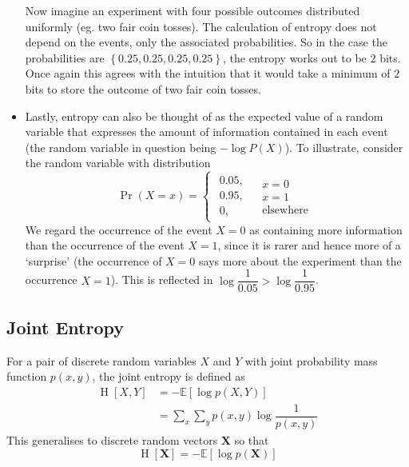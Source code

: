 \documentclass[11pt]{report} %
\begin{document}
\begin{itemize}
Now imagine an experiment with four possible outcomes distributed uniformly (eg. two fair coin tosses). The calculation of entropy does not depend on the events, only the associated probabilities. So in the case the probabilities are $\left\{0.25, 0.25, 0.25, 0.25\right\}$, the entropy works out to be $2$ bits. Once again this agrees with the intuition that it would take a minimum of $2$ bits to store the outcome of two fair coin tosses.
\item Lastly, entropy can also be thought of as the expected value of a random variable that expresses the amount of information contained in each event (the random variable in question being $-\log P\left(X\right)$). To illustrate, consider the random variable with distribution
\begin{equation}
\operatorname{Pr}\left(X = x\right) = \begin{cases}
\begin{array}{c}
0.05,\\
0.95,\\
0,
\end{array} & \begin{array}{c}
x=0\\
x=1\\
\text{elsewhere}
\end{array}\end{cases}
\end{equation}
We regard the occurrence of the event $X = 0$ as containing more information than the occurrence of the event $X = 1$, since it is rarer and hence more of a `surprise' (the occurrence of $X = 0$ says more about the experiment than the occurrence $X = 1$). This is reflected in $\log\dfrac{1}{0.05} > \log\dfrac{1}{0.95}$.
\end{itemize}

\subsection{Joint Entropy}

For a pair of discrete random variables $X$ and $Y$ with joint probability mass function $p\left(x, y\right)$, the joint entropy is defined as
\begin{align}
\operatorname{H}\left[X, Y\right] &= -\mathbb{E}\left[\log p\left(X, Y\right)\right] \\
&= \sum_{x}\sum_{y}p\left(x, y\right)\log\dfrac{1}{p\left(x, y\right)}
\end{align}
This generalises to discrete random vectors $\mathbf{X}$ so that
\begin{equation}
\operatorname{H}\left[\mathbf{X}\right] = -\mathbb{E}\left[\log p\left(\mathbf{X}\right)\right]
\end{equation}
\end{document}
